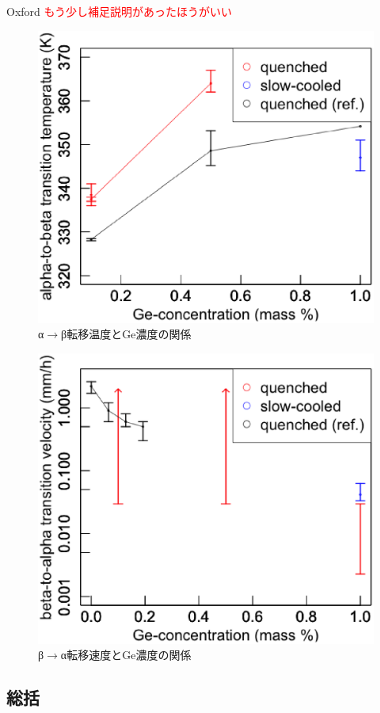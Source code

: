 Oxford \textcolor{red}{もう少し補足説明があったほうがいい}

\begin{figure}[!h]
    \begin{center}
   \includegraphics[width=0.6\hsize]{samples/TransitionT.eps}
  \end{center}
  \caption{α$\to$β転移温度とGe濃度の関係}
  \label{fig:TransitionT}
\end{figure}

\begin{figure}[!h]
    \begin{center}
   \includegraphics[width=0.6\hsize]{samples/Transtionvelocity_beta_to_alpha.eps}
  \end{center}
  \caption{β$\to$α転移速度とGe濃度の関係}
  \label{fig:Transtionvelocity_beta_to_alpha}
\end{figure}

\subsection{総括}


